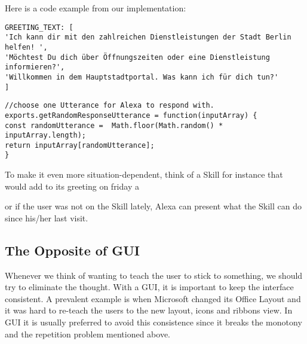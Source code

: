 \noindent  Here is a code example from our implementation:

\begin{verbatim}
GREETING_TEXT: [
'Ich kann dir mit den zahlreichen Dienstleistungen der Stadt Berlin helfen! ',
'Möchtest Du dich über Öffnungszeiten oder eine Dienstleistung informieren?',
'Willkommen in dem Hauptstadtportal. Was kann ich für dich tun?'
]
\end{verbatim}

\begin{verbatim}
//choose one Utterance for Alexa to respond with.
exports.getRandomResponseUtterance = function(inputArray) {
const randomUtterance =  Math.floor(Math.random() * inputArray.length);
return inputArray[randomUtterance];
}
\end{verbatim}

\noindent To make it even more situation-dependent, think of a Skill for instance that would add to its greeting on friday a 


\begin{flushright}
\end{flushright}


\noindent or if the user was not on the Skill lately, Alexa can present what the Skill can do since his/her last visit.





\subsection*{The Opposite of GUI}
Whenever we think of wanting to teach the user to stick to something, we should try to eliminate the thought. With a GUI, it is important to keep the interface consistent. A prevalent example is when Microsoft changed its Office Layout and it was hard to re-teach the users to the new layout, icons and ribbons view. In GUI it is usually preferred to avoid this consistence since it breaks the monotony and the repetition problem mentioned above.

